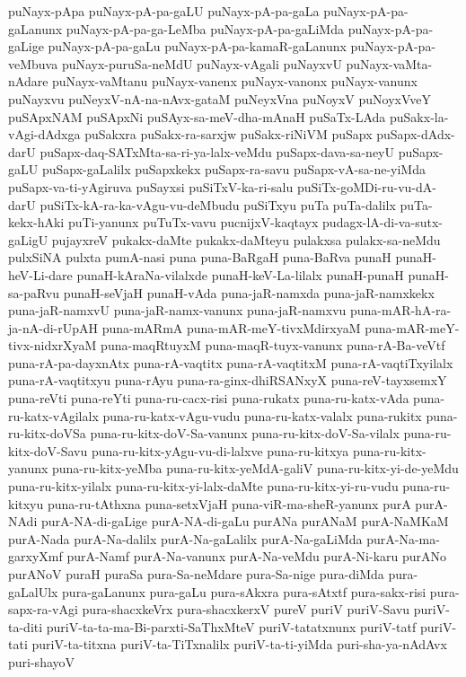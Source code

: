 {puNayx-pApa
puNayx-pA-pa-gaLU
puNayx-pA-pa-gaLa
puNayx-pA-pa-gaLanunx
puNayx-pA-pa-ga-LeMba
puNayx-pA-pa-gaLiMda
puNayx-pA-pa-gaLige
puNayx-pA-pa-gaLu
puNayx-pA-pa-kamaR-gaLanunx
puNayx-pA-pa-veMbuva
puNayx-puruSa-neMdU
puNayx-vAgali
puNayxvU
puNayx-vaMta-nAdare
puNayx-vaMtanu
puNayx-vanenx
puNayx-vanonx
puNayx-vanunx
puNayxvu
puNeyxV-nA-na-nAvx-gataM
puNeyxVna
puNoyxV
puNoyxVveY
puSApxNAM
puSApxNi
puSAyx-sa-meV-dha-mAnaH
puSaTx-LAda
puSakx-la-vAgi-dAdxga
puSakxra
puSakx-ra-sarxjw
puSakx-riNiVM
puSapx
puSapx-dAdx-darU
puSapx-daq-SATxMta-sa-ri-ya-lalx-veMdu
puSapx-dava-sa-neyU
puSapx-gaLU
puSapx-gaLalilx
puSapxkekx
puSapx-ra-savu
puSapx-vA-sa-ne-yiMda
puSapx-va-ti-yAgiruva
puSayxsi
puSiTxV-ka-ri-salu
puSiTx-goMDi-ru-vu-dA-darU
puSiTx-kA-ra-ka-vAgu-vu-deMbudu
puSiTxyu
puTa
puTa-dalilx
puTa-kekx-hAki
puTi-yanunx
puTuTx-vavu
pucnijxV-kaqtayx
pudagx-lA-di-va-sutx-gaLigU
pujayxreV
pukakx-daMte
pukakx-daMteyu
pulakxsa
pulakx-sa-neMdu
pulxSiNA
pulxta
pumA-nasi
puna
puna-BaRgaH
puna-BaRva
punaH
punaH-heV-Li-dare
punaH-kAraNa-vilalxde
punaH-keV-La-lilalx
punaH-punaH
punaH-sa-paRvu
punaH-seVjaH
punaH-vAda
puna-jaR-namxda
puna-jaR-namxkekx
puna-jaR-namxvU
puna-jaR-namx-vanunx
puna-jaR-namxvu
puna-mAR-hA-ra-ja-nA-di-rUpAH
puna-mARmA
puna-mAR-meY-tivxMdirxyaM
puna-mAR-meY-tivx-nidxrXyaM
puna-maqRtuyxM
puna-maqR-tuyx-vanunx
puna-rA-Ba-veVtf
puna-rA-pa-dayxnAtx
puna-rA-vaqtitx
puna-rA-vaqtitxM
puna-rA-vaqtiTxyilalx
puna-rA-vaqtitxyu
puna-rAyu
puna-ra-ginx-dhiRSANxyX
puna-reV-tayxsemxY
puna-reVti
puna-reYti
puna-ru-cacx-risi
puna-rukatx
puna-ru-katx-vAda
puna-ru-katx-vAgilalx
puna-ru-katx-vAgu-vudu
puna-ru-katx-valalx
puna-rukitx
puna-ru-kitx-doVSa
puna-ru-kitx-doV-Sa-vanunx
puna-ru-kitx-doV-Sa-vilalx
puna-ru-kitx-doV-Savu
puna-ru-kitx-yAgu-vu-di-lalxve
puna-ru-kitxya
puna-ru-kitx-yanunx
puna-ru-kitx-yeMba
puna-ru-kitx-yeMdA-galiV
puna-ru-kitx-yi-de-yeMdu
puna-ru-kitx-yilalx
puna-ru-kitx-yi-lalx-daMte
puna-ru-kitx-yi-ru-vudu
puna-ru-kitxyu
puna-ru-tAthxna
puna-setxVjaH
puna-viR-ma-sheR-yanunx
purA
purA-NAdi
purA-NA-di-gaLige
purA-NA-di-gaLu
purANa
purANaM
purA-NaMKaM
purA-Nada
purA-Na-dalilx
purA-Na-gaLalilx
purA-Na-gaLiMda
purA-Na-ma-garxyXmf
purA-Namf
purA-Na-vanunx
purA-Na-veMdu
purA-Ni-karu
purANo
purANoV
puraH
puraSa
pura-Sa-neMdare
pura-Sa-nige
pura-diMda
pura-gaLalUlx
pura-gaLanunx
pura-gaLu
pura-sAkxra
pura-sAtxtf
pura-sakx-risi
pura-sapx-ra-vAgi
pura-shacxkeVrx
pura-shacxkerxV
pureV
puriV
puriV-Savu
puriV-ta-diti
puriV-ta-ta-ma-Bi-parxti-SaThxMteV
puriV-tatatxnunx
puriV-tatf
puriV-tati
puriV-ta-titxna
puriV-ta-TiTxnalilx
puriV-ta-ti-yiMda
puri-sha-ya-nAdAvx
puri-shayoV
}
